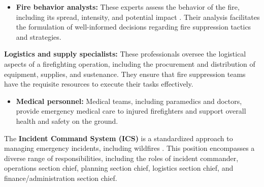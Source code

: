 \documentclass[
  12 pt,
]{Nemilov}
\providecommand{\tightlist}{%
  \setlength{\itemsep}{0pt}\setlength{\parskip}{0pt}}
\begin{document}
\begin{itemize}
\tightlist
\item
  \textbf{Fire behavior analysts:} These experts assess the behavior of the fire, including its spread, intensity, and potential impact \citep{adkins2021aerial, molina2007wildland}. Their analysis facilitates the formulation of well-informed decisions regarding fire suppression tactics and strategies.
\end{itemize}

\textbf{Logistics and supply specialists:}
These professionals oversee the logistical aspects of a firefighting operation, including the procurement and distribution of equipment, supplies, and sustenance. They ensure that fire suppression teams have the requisite resources to execute their tasks effectively.

\begin{itemize}
\tightlist
\item
  \textbf{Medical personnel:} Medical teams, including paramedics and doctors, provide emergency medical care to injured firefighters and support overall health and safety on the ground.
\end{itemize}

The \textbf{Incident Command System (ICS)} is a standardized approach to managing emergency incidents, including wildfires \citep{jensen2016incident, wang2012application}. This position encompasses a diverse range of responsibilities, including the roles of incident commander, operations section chief, planning section chief, logistics section chief, and finance/administration section chief.
\end{document}

